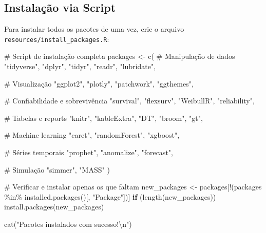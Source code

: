 \documentclass[
  letterpaper,
]{book}
\newenvironment{Shaded}{\begin{snugshade}}{\end{snugshade}}
\newcommand{\CommentTok}[1]{\textcolor[rgb]{0.37,0.37,0.37}{#1}}
\newcommand{\ControlFlowTok}[1]{\textcolor[rgb]{0.00,0.23,0.31}{\textbf{#1}}}
\newcommand{\FunctionTok}[1]{\textcolor[rgb]{0.28,0.35,0.67}{#1}}
\newcommand{\NormalTok}[1]{\textcolor[rgb]{0.00,0.23,0.31}{#1}}
\newcommand{\OtherTok}[1]{\textcolor[rgb]{0.00,0.23,0.31}{#1}}
\newcommand{\SpecialCharTok}[1]{\textcolor[rgb]{0.37,0.37,0.37}{#1}}
\newcommand{\StringTok}[1]{\textcolor[rgb]{0.13,0.47,0.30}{#1}}
\begin{document}
\subsection*{Instalação via Script}\label{instalauxe7uxe3o-via-script}

Para instalar todos os pacotes de uma vez, crie o arquivo
\texttt{resources/install\_packages.R}:

\begin{Shaded}
\begin{Highlighting}[]
\CommentTok{\# Script de instalação completa}
\NormalTok{packages }\OtherTok{\textless{}{-}} \FunctionTok{c}\NormalTok{(}
    \CommentTok{\# Manipulação de dados}
    \StringTok{"tidyverse"}\NormalTok{, }\StringTok{"dplyr"}\NormalTok{, }\StringTok{"tidyr"}\NormalTok{, }\StringTok{"readr"}\NormalTok{, }\StringTok{"lubridate"}\NormalTok{,}

    \CommentTok{\# Visualização}
    \StringTok{"ggplot2"}\NormalTok{, }\StringTok{"plotly"}\NormalTok{, }\StringTok{"patchwork"}\NormalTok{, }\StringTok{"ggthemes"}\NormalTok{,}

    \CommentTok{\# Confiabilidade e sobrevivência}
    \StringTok{"survival"}\NormalTok{, }\StringTok{"flexsurv"}\NormalTok{, }\StringTok{"WeibullR"}\NormalTok{, }\StringTok{"reliability"}\NormalTok{,}

    \CommentTok{\# Tabelas e reports}
    \StringTok{"knitr"}\NormalTok{, }\StringTok{"kableExtra"}\NormalTok{, }\StringTok{"DT"}\NormalTok{, }\StringTok{"broom"}\NormalTok{, }\StringTok{"gt"}\NormalTok{,}

    \CommentTok{\# Machine learning}
    \StringTok{"caret"}\NormalTok{, }\StringTok{"randomForest"}\NormalTok{, }\StringTok{"xgboost"}\NormalTok{,}

    \CommentTok{\# Séries temporais}
    \StringTok{"prophet"}\NormalTok{, }\StringTok{"anomalize"}\NormalTok{, }\StringTok{"forecast"}\NormalTok{,}

    \CommentTok{\# Simulação}
    \StringTok{"simmer"}\NormalTok{, }\StringTok{"MASS"}
\NormalTok{)}

\CommentTok{\# Verificar e instalar apenas os que faltam}
\NormalTok{new\_packages }\OtherTok{\textless{}{-}}\NormalTok{ packages[}\SpecialCharTok{!}\NormalTok{(packages }\SpecialCharTok{\%in\%} \FunctionTok{installed.packages}\NormalTok{()[, }\StringTok{"Package"}\NormalTok{])]}
\ControlFlowTok{if}\NormalTok{ (}\FunctionTok{length}\NormalTok{(new\_packages)) }\FunctionTok{install.packages}\NormalTok{(new\_packages)}

\FunctionTok{cat}\NormalTok{(}\StringTok{"Pacotes instalados com sucesso!}\SpecialCharTok{\textbackslash{}n}\StringTok{"}\NormalTok{)}
\end{Highlighting}
\end{Shaded}
\end{document}
